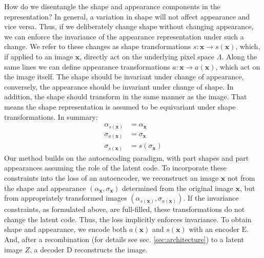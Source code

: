 	How do we disentangle the shape and appearance components in the representation? In general, a variation in shape will not affect appearance and vice versa. Thus, if we deliberately change shape without changing appearance, we can enforce the invariance of the appearance representation under such a change.
	We refer to these changes as shape transformations $s: \mathbf{x} \rightarrow s(\mathbf{x})$, which, if applied to an image $\mathbf{x}$, directly act on the underlying pixel space $\Lambda$.
	Along the same lines we can define appearance transformations $a: \mathbf{x} \rightarrow a(\mathbf{x})$, which act on the image itself.
	The shape should be invariant under change of appearance, conversely, the appearance should be invariant under change of shape.
	In addition, the shape should transform in the same manner as the image.
	That means the shape representation is assumed to be equivariant under shape transformations.
	In summary:
	\begin{align}
		{\alpha}_{s(\mathbf{x})}  &= {\alpha}_{\mathbf{x}} \tag{invariance of appearance}\\
		{\sigma}_{a(\mathbf{x})} &= {\sigma}_{\mathbf{x}}  \tag{invariance of shape}\\
		{\sigma}_{s(\mathbf{x})} &= s({\sigma}_{\mathbf{x}}) \tag{equivariance of shape}
	\label{eq:invar}
	\end{align} %
	Our method builds on the autoencoding paradigm, with part shapes and part appearances assuming the role of the latent code.
	To incorporate these constraints into the loss of an autoencoder, we reconstruct an image $\mathbf{x}$ not from the shape and appearance $({\alpha}_\mathbf{x}, {\sigma}_\mathbf{x})$ determined from the original image $\mathbf{x}$, but from appropriately transformed images $({\alpha}_{s(\mathbf{x})}, {\sigma}_{a(\mathbf{x})})$.
	If the invariance constraints, as formulated above, are full-filled, these transformations do not change the latent code.
	Thus, the loss implicitly enforces invariance.
	To obtain shape and appearance, we encode both $a(\mathbf{x})$ and $s(\mathbf{x})$ with an encoder $\mathrm{E}$.
	And, after a recombination (for details see sec. \ref{sec:architecture}) to a latent image $Z$, a decoder $\mathrm{D}$ reconstructs the image.
